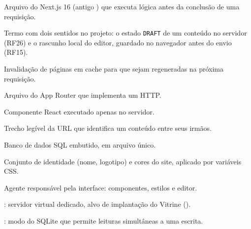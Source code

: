 \begin{description}[style=nextline, leftmargin=0.6cm, itemsep=4pt]
  \item[Proxy] Arquivo do Next.js 16 (antigo ) que executa lógica antes da conclusão de uma requisição.
  \item[Rascunho] Termo com dois sentidos no projeto: o estado \texttt{DRAFT} de um conteúdo no servidor (RF26) e o rascunho local do editor, guardado no navegador antes do envio (RF15).
  \item[Revalidação] Invalidação de páginas em cache para que sejam regeneradas na próxima requisição.
  \item[Route Handler] Arquivo  do App Router que implementa um  HTTP.
  \item[Server Component] Componente React executado apenas no servidor.
  \item[Slug] Trecho legível da URL que identifica um conteúdo entre seus irmãos.
  \item[SQLite] Banco de dados SQL embutido, em arquivo único.
  \item[Tema] Conjunto de identidade (nome, logotipo) e cores do site, aplicado por variáveis CSS.
  \item[UI] Agente responsável pela interface: componentes, estilos e editor.
  \item[VPS] : servidor virtual dedicado, alvo de implantação do Vitrine ().
  \item[WAL] : modo do SQLite que permite leituras simultâneas a uma escrita.
\end{description}
